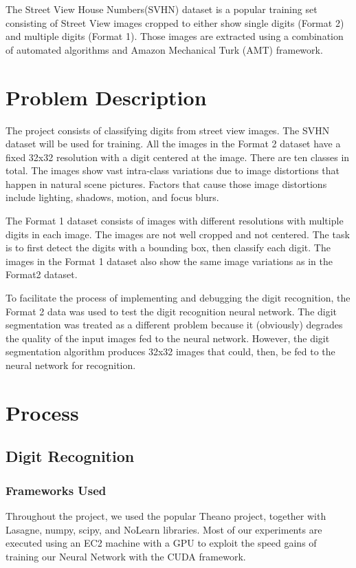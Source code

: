 \documentclass{article} %
\begin{document}
The Street View House Numbers(SVHN)\cite{svhn} dataset is a popular training set consisting of Street View images cropped to either show single digits (Format 2) and multiple digits (Format 1). Those images are extracted using a combination of automated algorithms and Amazon Mechanical Turk (AMT) framework.


\section{Problem Description}
The project consists of classifying digits from street view images. The SVHN dataset will be used for training. All the images in the Format 2 dataset have a fixed 32x32 resolution with a digit centered at the image. There are ten classes in total. The images show vast intra-class  variations due to image distortions that happen in natural scene pictures. Factors that cause those image distortions include lighting, shadows, motion, and focus blurs.

The Format 1 dataset consists of images with different resolutions with multiple digits in each image. The images are not well cropped and not centered. The task is to first detect the digits with a bounding box, then classify each digit. The images in the Format 1 dataset also show the same image variations as in the Format2 dataset.

To facilitate the process of implementing and debugging the digit recognition, the Format 2 data was used to test the digit recognition neural network. The digit segmentation was treated as a different problem because it (obviously) degrades the quality of the input images fed to the neural network. However, the digit segmentation algorithm produces 32x32 images that could, then, be fed to the neural network for recognition.

\section{Process}
\subsection{Digit Recognition}
\subsubsection{Frameworks Used}
Throughout the project, we used the popular Theano project\cite{theano}, together with Lasagne\cite{lasagne}, numpy, scipy\cite{numpyscipy}, and NoLearn\cite{nolearn} libraries. Most of our experiments are executed using an EC2 machine with a GPU to exploit the speed gains of training our Neural Network with the CUDA framework.
\end{document}

